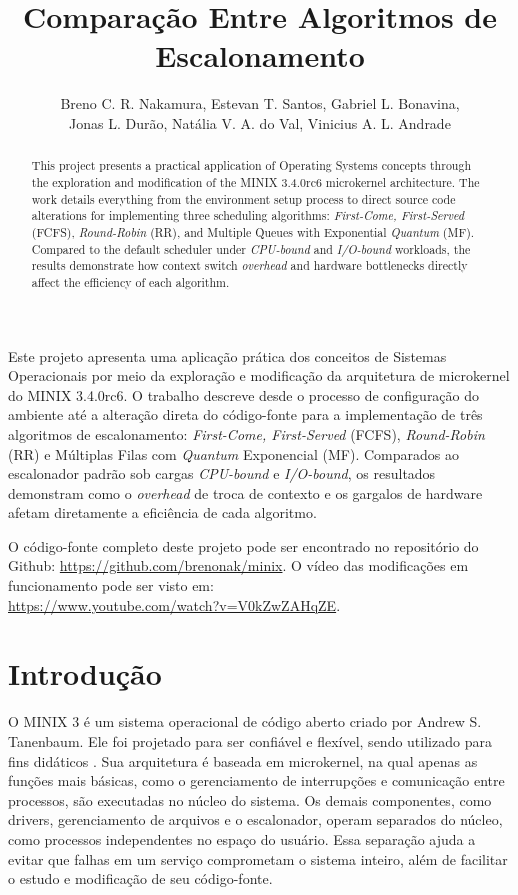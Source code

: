 \documentclass[12pt]{article}
\title{Comparação Entre Algoritmos de Escalonamento}
\author{Breno C. R. Nakamura\inst{1}, Estevan T. Santos\inst{1}, Gabriel L. Bonavina\inst{1}, \\
Jonas L. Durão\inst{1}, Natália V. A. do Val\inst{1}, Vinicius A. L. Andrade\inst{1}}
\begin{document}
 

\maketitle

\begin{abstract}
This project presents a practical application of Operating Systems concepts through the exploration and modification of the MINIX 3.4.0rc6 microkernel architecture. The work details everything from the environment setup process to direct source code alterations for implementing three scheduling algorithms: \textit{First-Come, First-Served} (FCFS), \textit{Round-Robin} (RR), and Multiple Queues with Exponential \textit{Quantum} (MF). Compared to the default scheduler under \textit{CPU-bound} and \textit{I/O-bound} workloads, the results demonstrate how context switch \textit{overhead} and hardware bottlenecks directly affect the efficiency of each algorithm.
\end{abstract}
     
\begin{resumo} 
Este projeto apresenta uma aplicação prática dos conceitos de Sistemas Operacionais por meio da exploração e modificação da arquitetura de microkernel do MINIX 3.4.0rc6. O trabalho descreve desde o processo de configuração do ambiente até a alteração direta do código-fonte para a implementação de três algoritmos de escalonamento: \textit{First-Come, First-Served} (FCFS), \textit{Round-Robin} (RR) e Múltiplas Filas com \textit{Quantum} Exponencial (MF). Comparados ao escalonador padrão sob cargas \textit{CPU-bound} e \textit{I/O-bound}, os resultados demonstram como o \textit{overhead} de troca de contexto e os gargalos de hardware afetam diretamente a eficiência de cada algoritmo.
\end{resumo}

O código-fonte completo deste projeto pode ser encontrado no repositório do Github: \url{https://github.com/brenonak/minix}. O vídeo das modificações em funcionamento pode ser visto em: \\ \url{https://www.youtube.com/watch?v=V0kZwZAHqZE}.

\section{Introdução}

O MINIX 3 é um sistema operacional de código aberto criado por Andrew S. Tanenbaum. Ele foi projetado para ser confiável e flexível, sendo utilizado para fins didáticos \cite{tanenbaum-MINIX}. Sua arquitetura é baseada em microkernel, na qual apenas as funções mais básicas, como o gerenciamento de interrupções e comunicação entre processos, são executadas no núcleo do sistema. Os demais componentes, como drivers, gerenciamento de arquivos e o escalonador, operam separados do núcleo, como processos independentes no espaço do usuário. Essa separação ajuda a evitar que falhas em um serviço comprometam o sistema inteiro, além de facilitar o estudo e modificação de seu código-fonte.
\end{document}
